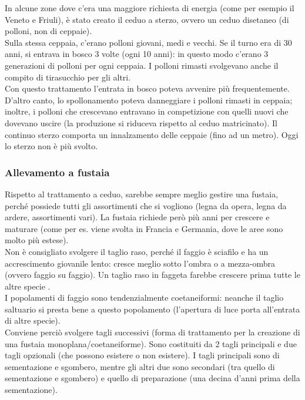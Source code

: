 In alcune zone dove c'era una maggiore richiesta di energia (come per esempio il Veneto e Friuli), è stato creato il ceduo a sterzo, ovvero un ceduo disetaneo (di polloni, non di ceppaie).\\
Sulla stessa ceppaia, c'erano polloni giovani, medi e vecchi. Se il turno era di 30 anni, si entrava in bosco 3 volte (ogni 10 anni): in questo modo c'erano 3 generazioni di polloni per ogni ceppaia. I polloni rimasti svolgevano anche il compito di tirasucchio per gli altri.\\
Con questo trattamento l'entrata in bosco poteva avvenire più frequentemente. D'altro canto, lo spollonamento poteva danneggiare i polloni rimasti in ceppaia; inoltre, i polloni che crescevano entravano in competizione con quelli nuovi che dovevano uscire (la produzione si riduceva rispetto al ceduo matricinato). Il continuo sterzo comporta un innalzamento delle ceppaie (fino ad un metro). Oggi lo sterzo non è più svolto.
\subsubsection{Allevamento a fustaia}
Rispetto al trattamento a ceduo, sarebbe sempre meglio gestire una fustaia, perché possiede tutti gli assortimenti che si vogliono (legna da opera, legna da ardere, assortimenti vari). La fustaia richiede però più anni per crescere e maturare (come per es. viene svolta in Francia e Germania, dove le aree sono molto più estese).\\
Non è consigliato svolgere il taglio raso, perché il faggio è sciafilo e ha un accrescimento giovanile lento: cresce meglio sotto l'ombra o a mezza-ombra (ovvero faggio su faggio). Un taglio raso in faggeta farebbe crescere prima tutte le altre specie .\\
I popolamenti di faggio sono tendenzialmente coetaneiformi: neanche il taglio saltuario si presta bene a questo popolamento (l'apertura di luce porta all'entrata di altre specie).\\
Conviene perciò svolgere tagli successivi (forma di trattamento per la creazione di una fustaia monoplana/coetaneiforme). Sono costituiti da 2 tagli principali e due tagli opzionali (che possono esistere o non esistere). I tagli principali sono di sementazione e sgombero, mentre gli altri due sono secondari (tra quello di sementazione e sgombero) e quello di preparazione (una decina d'anni prima della sementazione). 